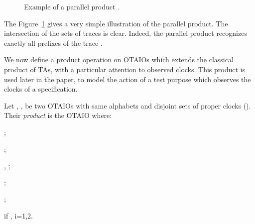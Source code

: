 \documentclass{LMCS}
\theoremstyle{plain}\newtheorem{proposition}[thm]{Proposition}
\begin{document}
\begin{center}
\begin{figure}[hbt]
{\begin{minipage}{0.52\textwidth}
\begin{center}
 \end{center}
 \end{minipage}}

 \caption{Example of a parallel product .}\label{ex_prodpar}\end{figure}   
 \end{center}


\begin{exa}

  The Figure~\ref{ex_prodpar} gives a very simple illustration of the
  parallel product. The intersection of the sets of traces is
  clear. Indeed, the parallel product recognizes exactly all
    prefixes of the trace .  

\end{exa}

We now define a product operation on OTAIOs which extends the
classical product of TAs, with a particular attention to observed
clocks. This product is used later in the paper, to model the action of a test purpose which observes the clocks of a specification.

\begin{defi}[Product]\label{def_product}
Let 
 ,
, be two OTAIOs with same alphabets and disjoint sets of proper clocks ().
Their {\em product} 
is the OTAIO 
 where:
\begin{iteMize}{}
\item 
; 
\item 
;
\item 
, ;
\item 
;
\item
;
\item 
 if
, i=1,2.
\end{iteMize}
\end{defi}
\end{document}
